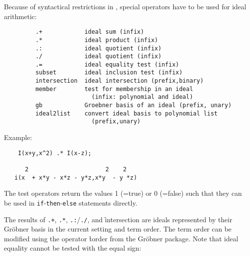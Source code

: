Because of syntactical restrictions in \REDUCE, special operators
have to be used for ideal arithmetic: 
\hypertarget{operator:IDEALSUM}{}
\hypertarget{operator:IDEALPRODUCT}{}
\hypertarget{operator:IDEALS_IDEALQUOTIENT}{}
\hypertarget{operator:IDEALQUOTIENTALT}{}
\hypertarget{operator:IDEALEQUALITY}{}
\hypertarget{operator:IDEALSUBSET}{}
\hypertarget{operator:IDEALINTERSECTION}{}
\hypertarget{operator:IDEALMEMBER}{}
\hypertarget{operator:IDEALGB}{}
\begin{verbatim}
         .+            ideal sum (infix)
         .*            ideal product (infix)
         .:            ideal quotient (infix)
         ./            ideal quotient (infix)
         .=            ideal equality test (infix)
         subset        ideal inclusion test (infix)
         intersection  ideal intersection (prefix,binary)
         member        test for membership in an ideal
                         (infix: polynomial and ideal)
         gb            Groebner basis of an ideal (prefix, unary)
         ideal2list    convert ideal basis to polynomial list 
                         (prefix,unary)
\end{verbatim}

Example:

\begin{verbatim}
    I(x+y,x^2) .* I(x-z);

      2                      2    2
   i(x  + x*y - x*z - y*z,x*y  - y *z)
\end{verbatim}

The test operators return the values 1 (=true) or 0 (=false)
such that they can be used in \REDUCE \texttt{if}-\texttt{then}-\texttt{else} statements
directly.

The results of \texttt{.+}, \texttt{.*}, \texttt{.:}/\texttt{./}, and \f{intersection} are ideals
represented by their Gr\"obner basis in the current setting and
term order. The term order can be modified using the operator
\f{torder} from the Gr\"obner package. Note that ideal equality 
cannot be tested with the \REDUCE equal sign:

